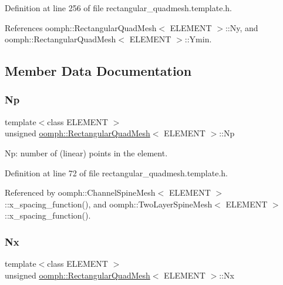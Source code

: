 Definition at line 256 of file rectangular\+\_\+quadmesh.\+template.\+h.



References oomph\+::\+Rectangular\+Quad\+Mesh$<$ E\+L\+E\+M\+E\+N\+T $>$\+::\+Ny, and oomph\+::\+Rectangular\+Quad\+Mesh$<$ E\+L\+E\+M\+E\+N\+T $>$\+::\+Ymin.



\subsection{Member Data Documentation}
\mbox{\label{classoomph_1_1RectangularQuadMesh_a92502c7536a6644ebffd806841cd4d98}} 
\subsubsection{\texorpdfstring{Np}{Np}}
{\footnotesize\ttfamily template$<$class E\+L\+E\+M\+E\+NT $>$ \\
unsigned \hyperlink{classoomph_1_1RectangularQuadMesh}{oomph\+::\+Rectangular\+Quad\+Mesh}$<$ E\+L\+E\+M\+E\+NT $>$\+::Np\hspace{0.3cm}{\ttfamily [protected]}}



Np\+: number of (linear) points in the element. 



Definition at line 72 of file rectangular\+\_\+quadmesh.\+template.\+h.



Referenced by oomph\+::\+Channel\+Spine\+Mesh$<$ E\+L\+E\+M\+E\+N\+T $>$\+::x\+\_\+spacing\+\_\+function(), and oomph\+::\+Two\+Layer\+Spine\+Mesh$<$ E\+L\+E\+M\+E\+N\+T $>$\+::x\+\_\+spacing\+\_\+function().

\mbox{\label{classoomph_1_1RectangularQuadMesh_a1b2c0a2d1f8399713033953c72d399ee}} 
\subsubsection{\texorpdfstring{Nx}{Nx}}
{\footnotesize\ttfamily template$<$class E\+L\+E\+M\+E\+NT $>$ \\
unsigned \hyperlink{classoomph_1_1RectangularQuadMesh}{oomph\+::\+Rectangular\+Quad\+Mesh}$<$ E\+L\+E\+M\+E\+NT $>$\+::Nx\hspace{0.3cm}{\ttfamily [protected]}}



